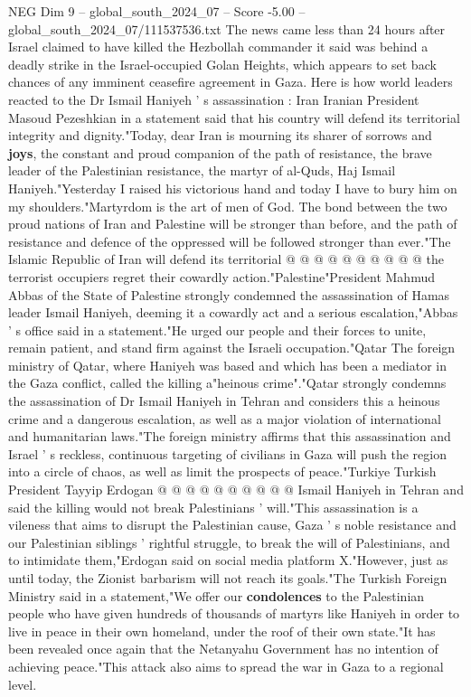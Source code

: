 \begin{textsample}{NEG Dim 9 – global\_south\_2024\_07 – Score -5.00 – global\_south\_2024\_07/111537536.txt}  \label{ex:f9_neg_335}
The news came less than 24 hours after Israel claimed to have killed the Hezbollah commander it said was behind a deadly strike in the Israel-occupied Golan Heights, which appears to set back chances of any imminent ceasefire agreement in Gaza.
Here is how world leaders reacted to the Dr Ismail Haniyeh ' s assassination : Iran Iranian President Masoud Pezeshkian in a statement said that his country will defend its territorial integrity and dignity."Today, dear Iran is mourning its sharer of sorrows and \textbf{joys}, the constant and proud companion of the path of resistance, the brave leader of the Palestinian resistance, the martyr of al-Quds, Haj Ismail Haniyeh."Yesterday I raised his victorious hand and today I have to bury him on my shoulders."Martyrdom is the art of men of God.
The bond between the two proud nations of Iran and Palestine will be stronger than before, and the path of resistance and defence of the oppressed will be followed stronger than ever."The Islamic Republic of Iran will defend its territorial @ @ @ @ @ @ @ @ @ @ the terrorist occupiers regret their cowardly action."Palestine"President Mahmud Abbas of the State of Palestine strongly condemned the assassination of Hamas leader Ismail Haniyeh, deeming it a cowardly act and a serious escalation,"Abbas ' s office said in a statement."He urged our people and their forces to unite, remain patient, and stand firm against the Israeli occupation."Qatar The foreign ministry of Qatar, where Haniyeh was based and which has been a mediator in the Gaza conflict, called the killing a"heinous crime"."Qatar strongly condemns the assassination of Dr Ismail Haniyeh in Tehran and considers this a heinous crime and a dangerous escalation, as well as a major violation of international and humanitarian laws."The foreign ministry affirms that this assassination and Israel ' s reckless, continuous targeting of civilians in Gaza will push the region into a circle of chaos, as well as limit the prospects of peace."Turkiye Turkish President Tayyip Erdogan @ @ @ @ @ @ @ @ @ @ Ismail Haniyeh in Tehran and said the killing would not break Palestinians ' will."This assassination is a vileness that aims to disrupt the Palestinian cause, Gaza ' s noble resistance and our Palestinian siblings ' rightful struggle, to break the will of Palestinians, and to intimidate them,"Erdogan said on social media platform X."However, just as until today, the Zionist barbarism will not reach its goals."The Turkish Foreign Ministry said in a statement,"We offer our \textbf{condolences} to the Palestinian people who have given hundreds of thousands of martyrs like Haniyeh in order to live in peace in their own homeland, under the roof of their own state."It has been revealed once again that the Netanyahu Government has no intention of achieving peace."This attack also aims to spread the war in Gaza to a regional level.

\end{textsample}
